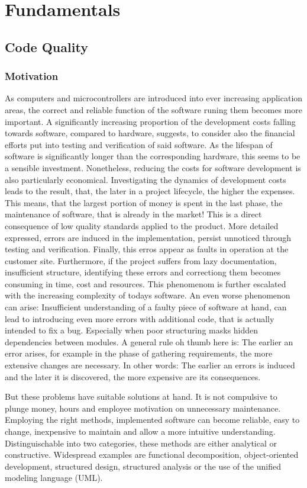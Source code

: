 \chapter{Fundamentals}
\label{cha:Fundamentals}
	\section{Code Quality}
	\subsection{Motivation}
As computers and microcontrollers are introduced into ever increasing application areas, the correct and reliable function of the software runing them becomes more important. A significantly increasing proportion of the development costs falling towards software, compared to hardware, suggests, to consider also the financial efforts put into testing and verification of said software. As the lifespan of software is significantly longer than the corresponding hardware, this seems to be a sensible investment. Nonetheless, reducing the costs for software development is also particularly economical. Investigating the dynamics of development costs leads to the result, that, the later in a project lifecycle, the higher the expenses. This means, that the largest portion of money is spent in the last phase, the maintenance of software, that is already in the market! This is a direct consequence of low quality standards applied to the product. More detailed expressed, errors are induced in the implementation, persist unnoticed through testing and verification. Finally, this erros appear as faults in operation at the customer site. Furthermore, if the project suffers from lazy documentation, insufficient structure, identifying these errors and correctiong them becomes consuming in time, cost and resources. This phenomenom is further escalated with the increasing complexity of todays software. An even worse phenomenon can arise: Insufficient understanding of a faulty piece of software at hand, can lead to introducing even more errors with additional code, that is actually intended to fix a bug. Especially when poor structuring masks hidden dependencies between modules. A general rule oh thumb here is: The earlier an error arises, for example in the phase of gathering requirements, the more extensive changes are necessary. In other words: The earlier an errors is induced and the later it is discovered, the more expensive are its consequences. 

But these problems have suitable solutions at hand. It is not compulsive to plunge money, hours and employee motivation on unnecessary maintenance. Employing the right methods, implemented software can become reliable, easy to change, inexpensive to maintain and allow a more intuitive understanding. Distinguischable into two categories, these methods are either analytical or constructive. Widespread examples are functional decomposition, object-oriented development, structured design, structured analysis or the use of the unified modeling language (UML).

